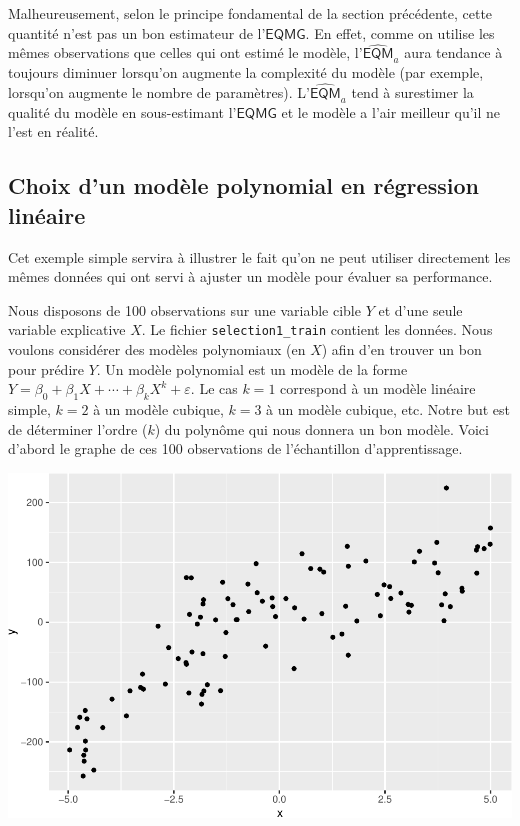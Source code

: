 \documentclass[
  11pt,
  letterpaper,
]{book}
\theoremstyle{definition}
\theoremstyle{definition}
\theoremstyle{definition}
\theoremstyle{remark}
\begin{document}
Malheureusement, selon le principe fondamental de la section précédente, cette quantité n'est pas un bon estimateur de l'\(\mathsf{EQMG}\). En effet, comme on utilise les mêmes observations que celles qui ont estimé le modèle, l'\(\widehat{\mathsf{EQM}}_a\) aura tendance à toujours diminuer lorsqu'on augmente la complexité du modèle (par exemple, lorsqu'on augmente le nombre de paramètres). L'\(\widehat{\mathsf{EQM}}_a\) tend à surestimer la qualité du modèle en sous-estimant l'\(\mathsf{EQMG}\) et le modèle a l'air meilleur qu'il ne l'est en réalité.

\hypertarget{choix-dun-moduxe8le-polynomial-en-ruxe9gression-linuxe9aire}{%
\subsection{Choix d'un modèle polynomial en régression linéaire}\label{choix-dun-moduxe8le-polynomial-en-ruxe9gression-linuxe9aire}}

Cet exemple simple servira à illustrer le fait qu'on ne peut utiliser directement les mêmes données qui ont servi à ajuster un modèle pour évaluer sa performance.

Nous disposons de 100 observations sur une variable cible \(Y\) et d'une seule variable explicative \(X\). Le fichier \texttt{selection1\_train} contient les données. Nous voulons considérer des modèles polynomiaux (en \(X\)) afin d'en trouver un bon pour prédire \(Y\). Un modèle polynomial est un modèle de la forme \(Y=\beta_0 + \beta_1X+\cdots+\beta_kX^k+\varepsilon\). Le cas \(k=1\) correspond à un modèle linéaire simple, \(k=2\) à un modèle cubique, \(k=3\) à un modèle cubique, etc. Notre but est de déterminer l'ordre (\(k\)) du polynôme qui nous donnera un bon modèle. Voici d'abord le graphe de ces 100 observations de l'échantillon d'apprentissage.

\begin{center}\includegraphics[width=0.7\linewidth]{MATH60602_files/figure-latex/02-graphedonneestest-1} \end{center}
\end{document}
